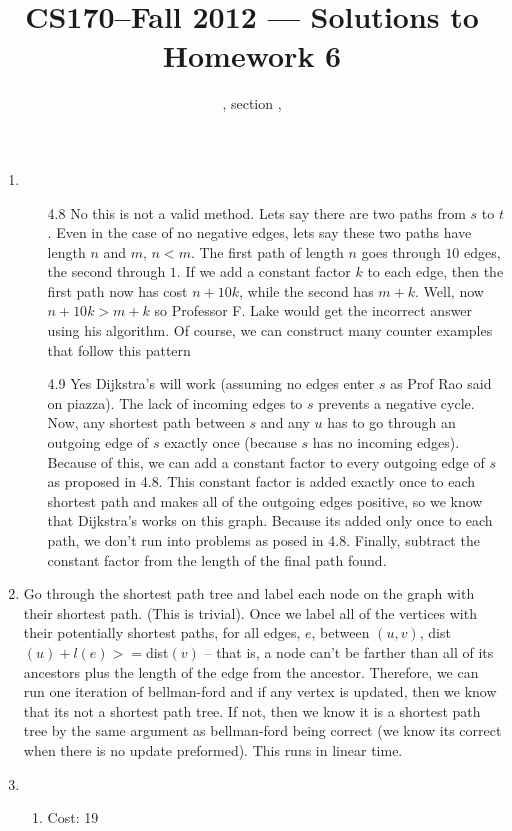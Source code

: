 \documentclass[11pt]{article}
\title{CS170--Fall 2012 --- Solutions to Homework 6}
\author{\Name, section \Sec, \texttt{\Login}}
\begin{document}
\maketitle
\begin{enumerate}
\item
\begin{enumerate}
\item[4.8] No this is not a valid method. Lets say there are two paths from $s$ to $t$. Even in the case of no negative edges, lets say these two paths have length $n$ and $m$, $n<m$. The first path of length $n$ goes through $10$ edges, the second through $1$. If we add a constant factor $k$ to each edge, then the first path now has cost $n+10k$, while the second has $m+k$. Well, now $n+10k > m+k$ so Professor F. Lake would get the incorrect answer using his algorithm. Of course, we can construct many counter examples that follow this pattern
\item[4.9]Yes Dijkstra's will work (assuming no edges enter $s$ as Prof Rao said on piazza). The lack of incoming edges to $s$ prevents a negative cycle. Now, any shortest path between $s$ and any $u$ has to go through an outgoing edge of $s$ exactly once (because $s$ has no incoming edges). Because of this, we can add a constant factor to every outgoing edge of $s$ as proposed in 4.8. This constant factor is added exactly once to each shortest path and makes all of the outgoing edges positive, so we know that Dijkstra's works on this graph. Because its added only once to each path, we don't run into problems as posed in 4.8. Finally, subtract the constant factor from the length of the final path found. 
\end{enumerate}
\newpage
\item Go through the shortest path tree and label each node on the graph with their shortest path. (This is trivial). Once we label all of the vertices with their potentially shortest paths, for all edges, $e$, between $(u,v)$, dist$(u) + l(e)>=$dist$(v)$ -- that is, a node can't be farther than all of its ancestors plus the length of the edge from the ancestor. Therefore, we can run one iteration of bellman-ford and if any vertex is updated, then we know that its not a shortest path tree. If not, then we know it is a shortest path tree by the same argument as bellman-ford being correct (we know its correct when there is no update preformed). This runs in linear time.
\newpage
\item
\begin{enumerate}
\item Cost: 19

\end{enumerate}
\end{enumerate}
\end{document}
